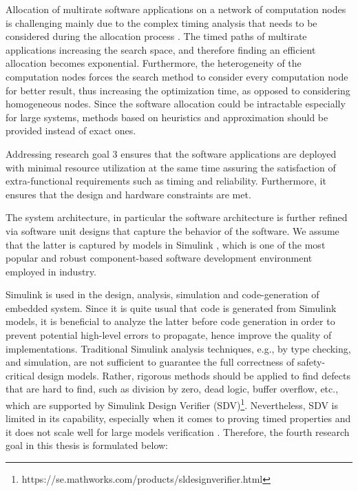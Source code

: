 \begin{researchgoal}
\end{researchgoal}

Allocation of multirate software applications on a network of computation nodes is challenging mainly due to the complex timing analysis that needs to be considered during the allocation process \cite{Mahmud5222, mubeen2013support}. The timed paths of multirate applications increasing the search space, and therefore finding an efficient allocation becomes exponential. Furthermore, the heterogeneity of the computation nodes forces the search method to consider every computation node for better result, thus increasing the optimization time, as opposed to considering homogeneous nodes. Since the software allocation could be intractable especially for large systems, methods based on heuristics and approximation should be provided instead of exact ones.

Addressing research goal 3 ensures that the software applications are deployed with minimal resource utilization at the same time assuring the satisfaction of extra-functional requirements such as timing and reliability. Furthermore, it ensures that the design and hardware constraints are met. 

The system architecture, in particular the software architecture is further refined via software unit designs that capture the behavior of the software. We assume that the latter is captured by models in Simulink \cite{JamesB.Dabney2003MasteringSimulink}, which is one of the most popular and robust component-based software development environment employed in industry. 

Simulink is used in the design, analysis, simulation and code-generation of embedded system. Since it is quite usual that code is generated from Simulink models, it is beneficial to analyze the latter before code generation in order to prevent potential high-level errors to propagate, hence improve the quality of implementations. Traditional Simulink analysis techniques, e.g., by type checking, and simulation, are not sufficient to guarantee the full correctness of safety-critical design models. Rather, rigorous methods should be applied to find defects that are hard to find, such as division by zero, dead logic, buffer overflow, etc., which are supported by Simulink Design Verifier (SDV)\footnote{https://se.mathworks.com/products/sldesignverifier.html}. Nevertheless, SDV is limited in its capability, especially when it comes to proving timed properties and it does not scale well for large models verification \cite{Leitner2008SimulinkStudy}. Therefore, the fourth research goal in this thesis is formulated below:
\begin{researchgoal}
\end{researchgoal}

